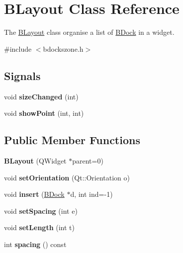 \hypertarget{class_b_layout}{\section{\-B\-Layout \-Class \-Reference}
\label{class_b_layout}
}


\-The \hyperlink{class_b_layout}{\-B\-Layout} class organise a list of \hyperlink{class_b_dock}{\-B\-Dock} in a widget.  




{\ttfamily \#include $<$bdockszone.\-h$>$}

\subsection*{\-Signals}
\begin{DoxyCompactItemize}
\item 
\hypertarget{class_b_layout_a9e27eb42d23daea4491e31dc65cde9bd}{void {\bfseries size\-Changed} (int)}\label{class_b_layout_a9e27eb42d23daea4491e31dc65cde9bd}

\item 
\hypertarget{class_b_layout_aa9926a76425a6fdc89131feec134444b}{void {\bfseries show\-Point} (int, int)}\label{class_b_layout_aa9926a76425a6fdc89131feec134444b}

\end{DoxyCompactItemize}
\subsection*{\-Public \-Member \-Functions}
\begin{DoxyCompactItemize}
\item 
\hypertarget{class_b_layout_aaa40bac25828f412e0c9f0295143222a}{{\bfseries \-B\-Layout} (\-Q\-Widget $\ast$parent=0)}\label{class_b_layout_aaa40bac25828f412e0c9f0295143222a}

\item 
\hypertarget{class_b_layout_a15af3c6623f5e820b011a237bd896fa5}{void {\bfseries set\-Orientation} (\-Qt\-::\-Orientation o)}\label{class_b_layout_a15af3c6623f5e820b011a237bd896fa5}

\item 
\hypertarget{class_b_layout_ad950c8e9f332986e6367081528de88d6}{void {\bfseries insert} (\hyperlink{class_b_dock}{\-B\-Dock} $\ast$d, int ind=-\/1)}\label{class_b_layout_ad950c8e9f332986e6367081528de88d6}

\item 
\hypertarget{class_b_layout_a2c129fc7bb433119b460eceac0540f85}{void {\bfseries set\-Spacing} (int e)}\label{class_b_layout_a2c129fc7bb433119b460eceac0540f85}

\item 
\hypertarget{class_b_layout_a59a4b4faeeac67c8260f4dd302ff3a66}{void {\bfseries set\-Length} (int t)}\label{class_b_layout_a59a4b4faeeac67c8260f4dd302ff3a66}

\item 
\hypertarget{class_b_layout_ac9a46249e19b37a07f049751df3ef391}{int {\bfseries spacing} () const }\label{class_b_layout_ac9a46249e19b37a07f049751df3ef391}

\end{DoxyCompactItemize}


